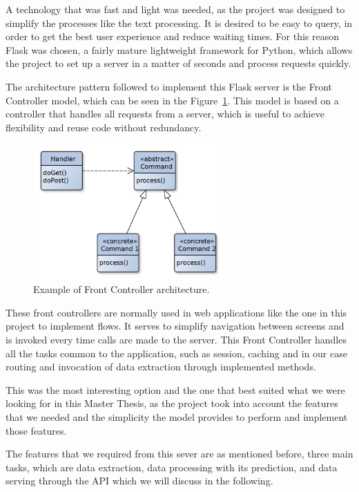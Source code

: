  A technology that was fast and light was needed, as the project was designed to simplify the processes like the text processing. It is desired to be easy to query, in order to get the best user experience and reduce waiting times. For this reason Flask was chosen, a fairly mature lightweight framework for Python, which allows the project to set up a server in a matter of seconds and process requests quickly.
 
 
 
 The architecture pattern followed to implement this Flask server is the Front Controller model, which can be seen in the Figure~\ref{fig:front-controller}. This model is based on a controller that handles all requests from a server, which is useful to achieve flexibility and reuse code without redundancy.

 
\begin{figure}[!htp]
    \centering
    \includegraphics[width=0.65\textwidth]{img/architecture/Front_Controller.png}
    \caption{Example of Front Controller architecture.}
    \label{fig:front-controller}
\end{figure}

These front controllers are normally used in web applications like the one in this project to implement flows. It serves to simplify navigation between screens and is invoked every time calls are made to the server. This Front Controller handles all the tasks common to the application, such as session, caching and in our case routing and invocation of data extraction through implemented methods.

This was the most interesting option and the one that best suited what we were looking for in this Master Thesis, as the project took into account the features that we needed and the simplicity the model provides to perform and implement those features. 

The features that we required from this sever are as mentioned before, three main tasks, which are data extraction, data processing with its prediction, and data serving through the API which we will discuss in the following.

